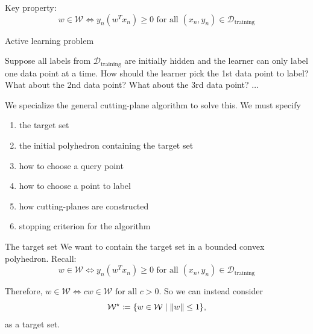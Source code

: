 \documentclass[pdf, 12pt]
{beamer}
\theoremstyle{definition}
\theoremstyle{remark}
\newcommand{\transpose}{T}
\begin{document}
\begin{frame}
      Key property:
    \begin{equation*}
          w \in \mathcal{W} \iff y_n (w^\transpose x_n) \geq 0 \text{ for all } (x_n, y_n) \in \mathcal{D}_\text{training}
    \end{equation*}
\end{frame}

\begin{frame}{Active learning problem}

    Suppose all labels from $\mathcal{D}_\text{training}$ are initially hidden and the learner can only label one data point at a time. How should the learner pick the 1st data point to label? What about the 2nd data point? What about the 3rd data point? $\dots$ 
\end{frame}

\begin{frame}
      We specialize the general cutting-plane algorithm to solve this.
      We must specify
        \begin{enumerate}
            \item the target set
            \item the initial polyhedron containing the target set
            \item how to choose a query point
            \item how to choose a point to label
            \item how cutting-planes are constructed 
            \item stopping criterion for the algorithm
        \end{enumerate}
\end{frame}

\begin{frame}{The target set} 
      We want to contain the target set in a bounded convex polyhedron. Recall: 
    \begin{equation*}
          w \in \mathcal{W} \iff y_n (w^\transpose x_n) \geq 0 \text{ for all } (x_n, y_n) \in \mathcal{D}_\text{training}
    \end{equation*}

    Therefore, $w \in \mathcal{W} \iff cw \in \mathcal{W} \text{ for all $c > 0$} $. So we can instead consider 
            \begin{equation*}
                \mathcal{W}^\star \coloneqq \{w \in \mathcal{W} \;|\; \norm{w} \leq 1\},
            \end{equation*}
      as a target set.
\end{frame}
\end{document}
